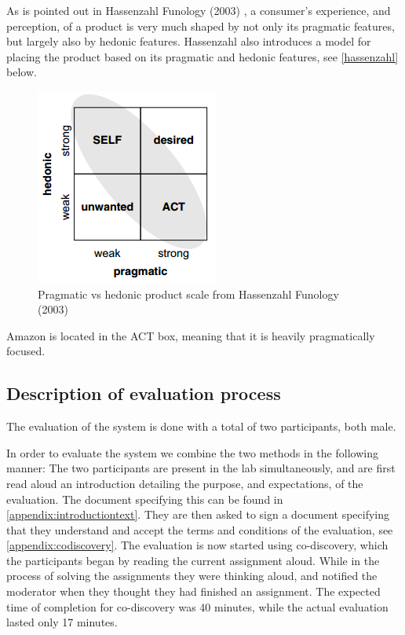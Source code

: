 As is pointed out in Hassenzahl Funology (2003) \citep{Hassenzahl2003}, a consumer's experience, and perception, of a product is very much shaped by not only its pragmatic features, but largely also  by hedonic features. Hassenzahl also introduces a model for placing the product based on its pragmatic and hedonic features, see \autoref{hassenzahl} below.

\begin{figure}[h]
\includegraphics[scale=0.55]{includes/hassenzahl.png}
\caption{Pragmatic vs hedonic product scale from Hassenzahl Funology (2003)}
\label{hassenzahl}
\end{figure}
Amazon is located in the ACT box, meaning that it is heavily pragmatically focused. 

\subsection{Description of evaluation process}
The evaluation of the system is done with a total of two participants, both male.

In order to evaluate the system we combine the two methods in the following manner: The two participants are present in the lab simultaneously, and are first read aloud an introduction detailing the purpose, and expectations, of the evaluation. The document specifying this can be found in \autoref{appendix:introductiontext}. They are then asked to sign a document specifying that they understand and accept the terms and conditions of the evaluation, see \autoref{appendix:codiscovery}.
The evaluation is now started using co-discovery, which the participants began by reading the current assignment aloud. While in the process of solving the assignments they were thinking aloud, and notified the moderator when they thought they had finished an assignment. The expected time of completion for co-discovery was 40 minutes, while the actual evaluation lasted only 17 minutes.

